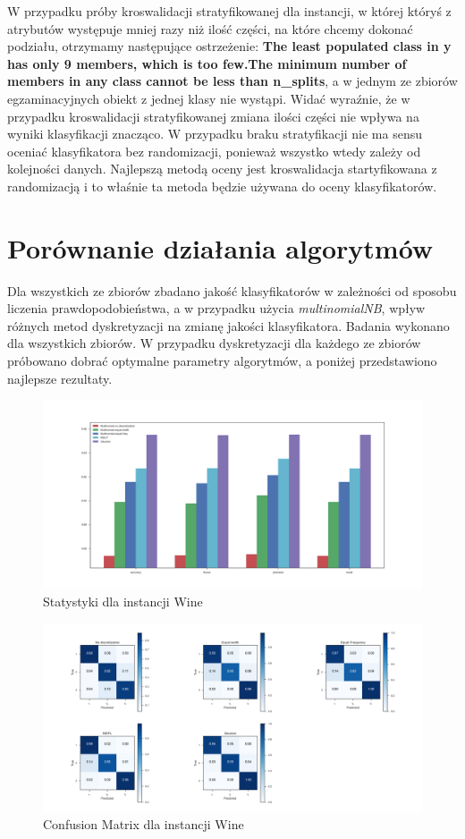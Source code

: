 \documentclass[12pt,a4paper]{article}
\begin{document}
W przypadku próby kroswalidacji stratyfikowanej dla instancji, w której któryś z atrybutów występuje mniej razy niż ilość części, na które chcemy dokonać podziału, otrzymamy następujące ostrzeżenie:
\textbf{The least populated class in y has only 9 members, which is too few.The minimum number of members in any class cannot be less than n\_splits}, a w jednym ze zbiorów egzaminacyjnych obiekt z jednej klasy nie wystąpi.
Widać wyraźnie, że w przypadku kroswalidacji stratyfikowanej zmiana ilości części nie wpływa na wyniki klasyfikacji znacząco. W przypadku braku stratyfikacji nie ma sensu oceniać klasyfikatora bez randomizacji, ponieważ wszystko wtedy zależy od kolejności danych. Najlepszą metodą oceny jest kroswalidacja startyfikowana z randomizacją i to właśnie ta metoda będzie używana do oceny klasyfikatorów. 



\section{Porównanie działania algorytmów}
Dla wszystkich ze zbiorów zbadano jakość klasyfikatorów w zależności od sposobu liczenia prawdopodobieństwa, a w przypadku użycia \emph{multinomialNB}, wpływ różnych metod dyskretyzacji na zmianę jakości klasyfikatora. Badania wykonano dla wszystkich zbiorów. W przypadku dyskretyzacji dla każdego ze zbiorów próbowano dobrać optymalne parametry algorytmów, a poniżej przedstawiono najlepsze rezultaty.

\begin{figure}[H]
\centering
\includegraphics[width=1\textwidth]{wineStats.png}
\caption{Statystyki dla instancji Wine}
\end{figure}

\begin{figure}[H]
\centering
\includegraphics[width=1\textwidth]{wineCM.png}
\caption{Confusion Matrix dla instancji Wine}
\end{figure}
\end{document}
